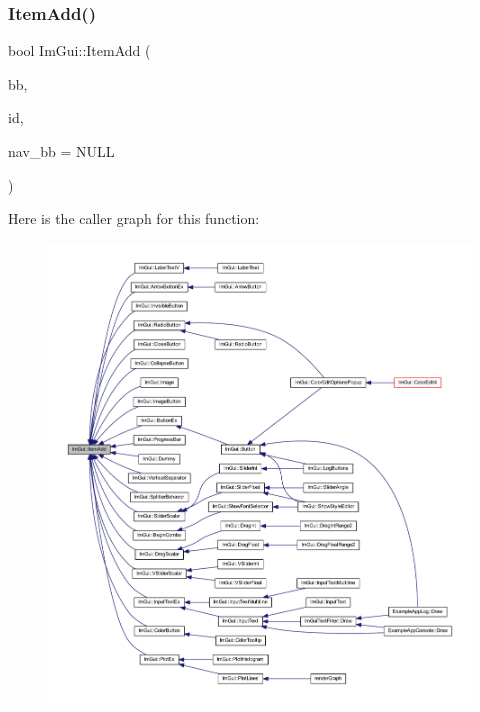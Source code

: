 \subsubsection{\texorpdfstring{Item\+Add()}{ItemAdd()}}
{\footnotesize\ttfamily bool Im\+Gui\+::\+Item\+Add (\begin{DoxyParamCaption}\item[{const \mbox{\hyperlink{struct_im_rect}{Im\+Rect}} \&}]{bb,  }\item[{\mbox{\hyperlink{imgui_8h_a1785c9b6f4e16406764a85f32582236f}{Im\+Gui\+ID}}}]{id,  }\item[{const \mbox{\hyperlink{struct_im_rect}{Im\+Rect}} $\ast$}]{nav\+\_\+bb = {\ttfamily NULL} }\end{DoxyParamCaption})}

Here is the caller graph for this function\+:
\nopagebreak
\begin{figure}[H]
\begin{center}
\leavevmode
\includegraphics[width=350pt]{namespace_im_gui_aa6e503009550f5e42d6eb4c146090929_icgraph}
\end{center}
\end{figure}
\mbox{\label{namespace_im_gui_a488b86a9f235923304186fb86ff64ffb}} 
